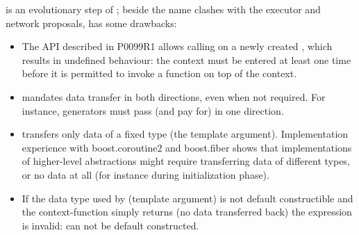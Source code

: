 \label{motivation}

\cc is an evolutionary step of \ectx; beside the name clashes with the executor
and network proposals, \ectx has some drawbacks:
\begin{itemize}
    \item The API described in P0099R1 allows calling
         on a newly
        created \ectx, which results in undefined behaviour: the context
        must be entered at least one time before it is permitted to
        invoke a function on top of the context.
    \item \ectx mandates data transfer in both directions, even when not
        required. For instance, generators must pass (and pay for)
         in one direction.
    \item \ectx transfers only data of a fixed type (the template
        argument). Implementation experience with boost.coroutine2 and
        boost.fiber shows that implementations of higher-level abstractions
        might require transferring data of different types, or no data at all
        (for instance during initialization phase).
    \item If the data type used by \ectx (template argument) is not default
        constructible and the context-function simply returns (no data
        transferred back) the expression  is
        invalid:  can not be default constructed.
\end{itemize}
